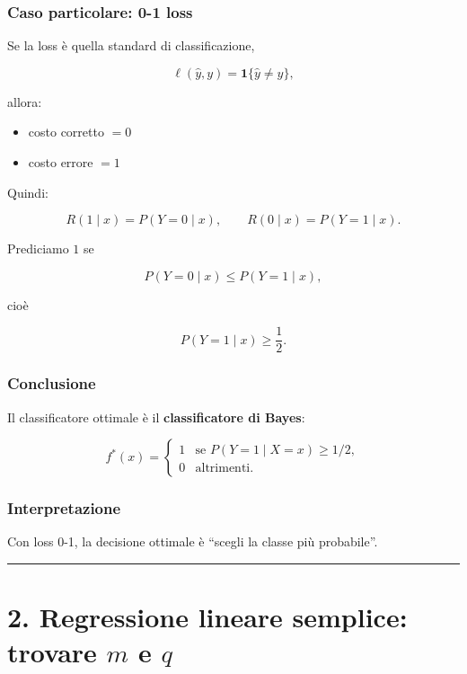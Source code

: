 \documentclass{article}
\providecommand{\tightlist}{%
  \setlength{\itemsep}{0pt}\setlength{\parskip}{0pt}}
\begin{document}
\subsubsection{Caso particolare: 0-1
loss}\label{caso-particolare-0-1-loss}

Se la loss è quella standard di classificazione,

\[
\ell(\hat y,y)=\mathbf{1}\{\hat y\neq y\},
\]

allora:

\begin{itemize}
\tightlist
\item
  costo corretto \(=0\)
\item
  costo errore \(=1\)
\end{itemize}

Quindi:

\[
R(1\mid x)=P(Y=0\mid x), \qquad R(0\mid x)=P(Y=1\mid x).
\]

Prediciamo \(1\) se

\[
P(Y=0\mid x)\le P(Y=1\mid x),
\]

cioè

\[
P(Y=1\mid x)\ge \frac{1}{2}.
\]

\subsubsection{Conclusione}\label{conclusione-2}

Il classificatore ottimale è il \textbf{classificatore di Bayes}:

\[
f^*(x)=
\begin{cases}
1 & \text{se } P(Y=1\mid X=x)\ge 1/2,\\
0 & \text{altrimenti.}
\end{cases}
\]

\subsubsection{Interpretazione}\label{interpretazione-2}

Con loss 0-1, la decisione ottimale è ``scegli la classe più
probabile''.

\begin{center}\rule{0.5\linewidth}{0.5pt}\end{center}

\section{\texorpdfstring{2. Regressione lineare semplice: trovare \(m\)
e
\(q\)}{2. Regressione lineare semplice: trovare m e q}}\label{regressione-lineare-semplice-trovare-m-e-q}
\end{document}
